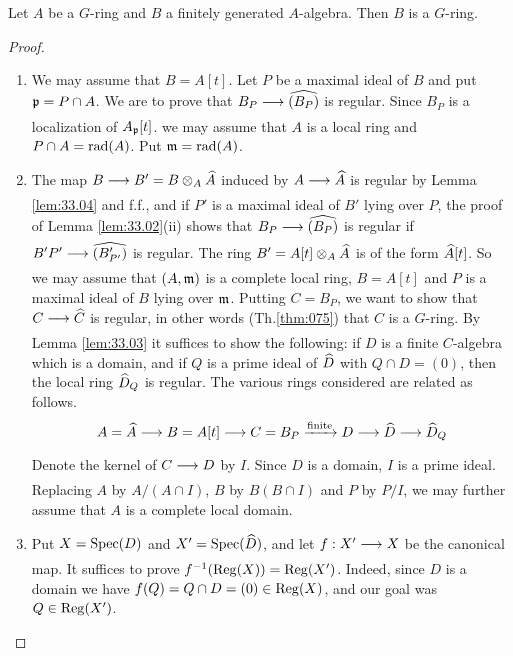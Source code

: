 \documentclass[../main]{subfiles}
\begin{document}
\begin{partheorem}[Grothendieck.]\label{thm:077} Let $A$ be a $G$-ring and $B$
a finitely generated $A$-algebra. Then $B$ is a $G$-ring.
\end{partheorem} 
\begin{proof}\phantom{,}
\begin{enumerate}[label = Step \Roman*.]
    \item We may assume that $B=A[t]$. Let $P$ be a maximal ideal of $B$ and put $\mathfrak{p}=P \cap A$. We are to prove that $B_P\varrightarrow{} \completion{(B_P)}$ is regular. Since $B_P$ is a localization of $A_{\mathfrak{p}}[t]$. we may assume that $A$ is a local ring and $P \cap A=\operatorname{rad}(A)$. Put $\mathfrak{m}=\operatorname{rad}(A)$.
    
    \item The map $B \varrightarrow{} B'=B \otimes_A \completion{A}$ induced by $A \varrightarrow{} \completion{A}$ is regular by Lemma \ref{lem:33.04} and f.f., and if $P'$ is a maximal ideal of $B'$ lying over $P$, the proof of Lemma \ref{lem:33.02}(ii) shows that $B_P \varrightarrow{}\completion{(B_P)}$ is regular if $B' P' \varrightarrow{}\completion{(B'_{P'})}$ is regular. The ring $B'= A[t] \otimes_A \widehat{A}$ is of the form $\widehat{A}[t]$. So we may assume that $(A, \mathfrak{m})$ is a complete local ring, $B=A[t]$ and $P$ is a maximal ideal of $B$ lying over $\mathfrak{m}$. Putting $C=B_P$, we want to show that $C \varrightarrow{} \completion{C}$ is regular, in other words (Th.\ref{thm:075}) that $C$ is a $G$-ring. By Lemma \ref{lem:33.03} it suffices to show the following: if $D$ is a finite $C$-algebra which is a domain, and if $Q$ is a prime ideal of $\widehat{D}$ with $Q \cap D=(0)$, then the local ring $\widehat{D}_Q$ is regular. The various rings considered are related as follows.
    \[A=\completion{A}\varrightarrow{}B=A[t] \varrightarrow{}C=B_P \varrightarrow{\text{finite}} D \varrightarrow{}\completion{D}\varrightarrow{}\completion{D}_Q\]
    Denote the kernel of $C\varrightarrow{}D$ by $I$. Since $D$ is a domain, $I$ is a prime ideal. Replacing $A$ by $A /(A \cap I)$, $B$ by $B(B \cap I)$ and $P$ by $P / I$, we may further assume that $A$ is a complete local domain.

    \item Put $X=\operatorname{Spec}(D)$ and $X'=\operatorname{Spec}(\widehat{D})$, and let $f: X' \varrightarrow{} X$ be the canonical map. It suffices to prove $f^{-1}(\operatorname{Reg}(X))=\operatorname{Reg}(X')$. Indeed, since $D$ is a domain we have $f(Q)=Q \cap D=(0) \in \operatorname{Reg}(X)$, and our goal was $Q \in \operatorname{Reg}(X')$.
    

\end{enumerate}
\end{proof}
\end{document}
